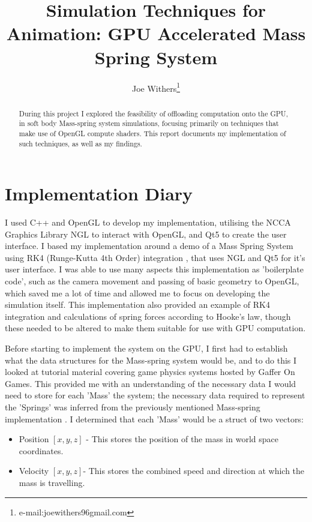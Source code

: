 \documentclass[]{acmsiggraph}
\title{Simulation Techniques for Animation: GPU Accelerated Mass Spring System}
\author{Joe Withers\thanks{e-mail:joewithers96gmail.com}}
\begin{document}

\maketitle

\begin{abstract}
During this project I explored the feasibility of offloading computation onto the GPU, in soft body Mass-spring system simulations, focusing primarily on techniques that make use of OpenGL compute shaders. This report documents my implementation of such techniques, as well as my findings.
\end{abstract}

\section{Implementation Diary} \label{sec:implementation}

I used C++ and OpenGL to develop my implementation, utilising the NCCA Graphics Library NGL \cite{ngl} to interact with OpenGL, and Qt5 to create the user interface. I based my implementation around a demo of a Mass Spring System using RK4 (Runge-Kutta 4th Order) integration \cite{nglMassSpring}, that uses NGL and Qt5 for it's user interface. I was able to use many aspects this implementation as 'boilerplate code', such as the camera movement and passing of basic geometry to OpenGL, which saved me a lot of time and allowed me to focus on developing the simulation itself. This implementation also provided an example of RK4 integration and calculations of spring forces according to Hooke's law, though these needed to be altered to make them suitable for use with GPU computation.

Before starting to implement the system on the GPU, I first had to establish what the data structures for the Mass-spring system would be, and to do this I looked at tutorial material covering game physics systems \cite{gafferPhys} hosted by Gaffer On Games. This provided me with an understanding of the necessary data I would need to store for each 'Mass' the system; the necessary data required to represent the 'Springs' was inferred from the previously mentioned Mass-spring implementation \cite{nglMassSpring}. I determined that each 'Mass' would be a struct of two vectors:
\begin{itemize}
	\item Position $[x, y, z]$ - This stores the position of the mass in world space coordinates.
	\item Velocity $[x, y, z]$- This stores the combined speed and direction at which the mass is travelling.
\end{itemize}
\end{document}

